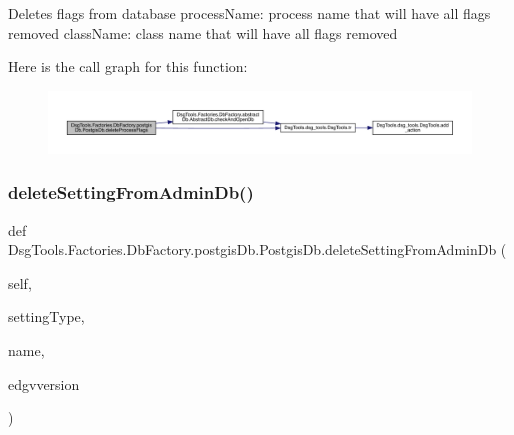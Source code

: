 \begin{DoxyVerb}Deletes flags from database
processName: process name that will have all flags removed
className: class name that will have all flags removed
\end{DoxyVerb}
 Here is the call graph for this function\+:
\nopagebreak
\begin{figure}[H]
\begin{center}
\leavevmode
\includegraphics[width=350pt]{class_dsg_tools_1_1_factories_1_1_db_factory_1_1postgis_db_1_1_postgis_db_a365a91237aedbc24dc4d263d6b572220_cgraph}
\end{center}
\end{figure}
\mbox{\label{class_dsg_tools_1_1_factories_1_1_db_factory_1_1postgis_db_1_1_postgis_db_a3269189dc84caffd1f24865c7f868cdf}} 
\subsubsection{\texorpdfstring{delete\+Setting\+From\+Admin\+Db()}{deleteSettingFromAdminDb()}}
{\footnotesize\ttfamily def Dsg\+Tools.\+Factories.\+Db\+Factory.\+postgis\+Db.\+Postgis\+Db.\+delete\+Setting\+From\+Admin\+Db (\begin{DoxyParamCaption}\item[{}]{self,  }\item[{}]{setting\+Type,  }\item[{}]{name,  }\item[{}]{edgvversion }\end{DoxyParamCaption})}

